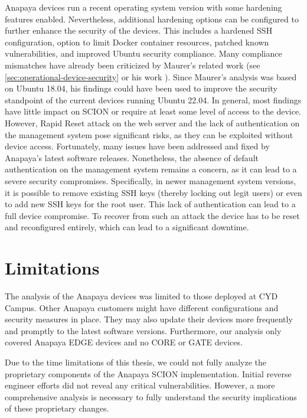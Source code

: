 Anapaya devices run a recent operating system version with some hardening features enabled.
Nevertheless, additional hardening options can be configured to further enhance the security of the devices.
This includes a hardened SSH configuration, option to limit Docker container resources, patched known vulnerabilities, and improved Ubuntu security compliance.
Many compliance mismatches have already been criticized by Maurer's related work (see \cref{sec:operational-device-security} or his work \cite{Maurer2021}).
Since Maurer's analysis was based on Ubuntu 18.04, his findings could have been used to improve the security standpoint of the current devices running Ubuntu 22.04.
In general, most findings have little impact on SCION or require at least some level of access to the device.
However, Rapid Reset attack on the web server and the lack of authentication on the management system pose significant risks, as they can be exploited without device access.
Fortunately, many issues have been addressed and fixed by Anapaya's latest software releases.
Nonetheless, the absence of default authentication on the management system remains a concern, as it can lead to a severe security compromises.
Specifically, in newer management system versions, it is possible to remove existing SSH keys (thereby locking out legit users) or even to add new SSH keys for the root user.
This lack of authentication can lead to a full device compromise.
To recover from such an attack the device has to be reset and reconfigured entirely, which can lead to a significant downtime.


\section{Limitations}
The analysis of the Anapaya devices was limited to those deployed at CYD Campus.
Other Anapaya customers might have different configurations and security measures in place.
They may also update their devices more frequently and promptly to the latest software versions.
Furthermore, our analysis only covered Anapaya EDGE devices and no CORE or GATE devices.

Due to the time limitations of this thesis, we could not fully analyze the proprietary components of the Anapaya SCION implementation.
Initial reverse engineer efforts did not reveal any critical vulnerabilities.
However, a more comprehensive analysis is necessary to fully understand the security implications of these proprietary changes.

